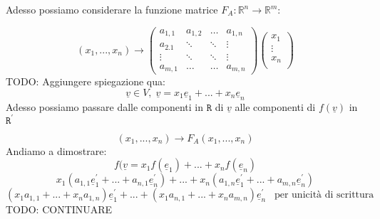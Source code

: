 Adesso possiamo considerare la funzione matrice $F_A: \mathbb{R}^n \rightarrow \mathbb{R}^m$:

$$ 
(x_1,...,x_n) \rightarrow
\begin{pmatrix}
a_{1,1} & a_{1,2} & \dots & a_{1,n} \\
a_{2.1} & \ddots & \ddots & \vdots \\
\vdots & \ddots & \ddots & \vdots \\
a_{m,1} & \dots & \dots & a_{m,n}
\end{pmatrix}
\begin{pmatrix}
x_1 \\ \vdots \\ x_n \\
\end{pmatrix}
$$
TODO: Aggiungere spiegazione qua:
$$ \underline{v} \in V, \; \underline{v}=x_1\underline{e}_1+...+x_n\underline{e}_n $$
Adesso possiamo passare dalle componenti in $\mathtt{R}$ di $\underline{v}$ alle componenti di $f(\underline{v})$ in $\mathtt{R}^{\prime}$

$$ 
(x_1,...,x_n) \rightarrow F_A(x_1,...,x_n)
$$
Andiamo a dimostrare:
$$f(\underline{v}= x_1f(\underline{e}_1)+...+x_nf(\underline{e}_n) $$
$$ x_1(a_{1,1}\underline{e}_1^{\prime}+...+a_{n,1}\underline{e}_n^{\prime}) + ... + x_n(a_{1,n}\underline{e}_1^{\prime}+...+a_{m,n}\underline{e}_n^{\prime}) $$
$$ (x_1a_{1,1}+...+x_na_{1,n})\underline{e}_1^{\prime} +...+ (x_1a_{n,1}+...+x_na_{m,n})\underline{e}_n^{\prime} \; \; \; \text{per unicità di scrittura} $$
TODO: CONTINUARE

